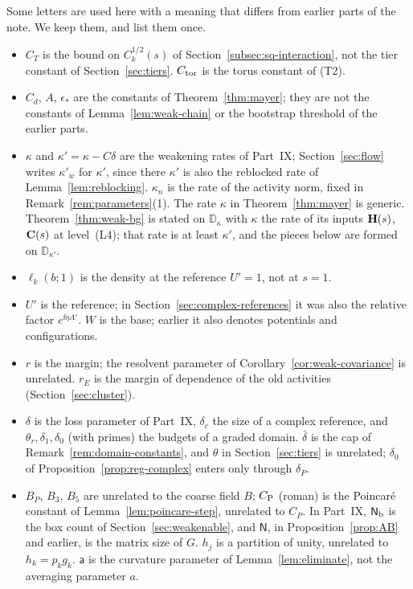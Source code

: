 \begin{remark}\label{rem:notation-flow}
Some letters are used here with a meaning that differs from earlier parts of the note. We keep them, and list them once.
\begin{itemize}
\item $C_T$ is the bound on $C_k^{1/2}(s)$ of Section~\ref{subsec:sq-interaction}, not the tier constant of Section~\ref{sec:tiers}. $C_{\rm tor}$ is the torus constant of (T2).
\item $C_d$, $A$, $\epsilon_*$ are the constants of Theorem~\ref{thm:mayer}; they are not the constants of Lemma~\ref{lem:weak-chain} or the bootstrap threshold of the earlier parts.
\item $\kappa$ and $\kappa'=\kappa-C\delta$ are the weakening rates of Part~IX; Section~\ref{sec:flow} writes $\kappa'_w$ for $\kappa'$, since there $\kappa'$ is also the reblocked rate of Lemma~\ref{lem:reblocking}. $\kappa_n$ is the rate of the activity norm, fixed in Remark~\ref{rem:parameters}(1). The rate $\kappa$ in Theorem~\ref{thm:mayer} is generic. Theorem~\ref{thm:weak-bg} is stated on $\mathbb D_\kappa$ with $\kappa$ the rate of its inputs $\mathbf H(s)$, $\mathbf C(s)$ at level~(L4); that rate is at least $\kappa'$, and the pieces below are formed on $\mathbb D_{\kappa'}$.
\item $\ell_k(b;1)$ is the density at the reference $U'=1$, not at $s=1$.
\item $U'$ is the reference; in Section~\ref{sec:complex-references} it was also the relative factor $e^{\ii\eta A'}$. $W$ is the base; earlier it also denotes potentials and configurations.
\item $r$ is the margin; the resolvent parameter of Corollary~\ref{cor:weak-covariance} is unrelated. $r_E$ is the margin of dependence of the old activities (Section~\ref{sec:cluster}).
\item $\delta$ is the loss parameter of Part~IX, $\delta_c$ the size of a complex reference, and $\theta_r,\delta_1,\delta_0$ (with primes) the budgets of a graded domain. $\bar\delta$ is the cap of Remark~\ref{rem:domain-constants}, and $\theta$ in Section~\ref{sec:tiers} is unrelated; $\delta_0$ of Proposition~\ref{prop:reg-complex} enters only through $\delta_P$.
\item $B_P$, $B_3$, $B_5$ are unrelated to the coarse field $B$; $C_{\rm P}$ (roman) is the Poincar\'e constant of Lemma~\ref{lem:poincare-step}, unrelated to $C_P$. In Part~IX, $\mathsf N_{\rm b}$ is the box count of Section~\ref{sec:weakenable}, and $\mathsf N$, in Proposition~\ref{prop:AB} and earlier, is the matrix size of $G$. $h_j$ is a partition of unity, unrelated to $h_k=p_kg_k$. $\mathsf a$ is the curvature parameter of Lemma~\ref{lem:eliminate}, not the averaging parameter $a$.

\end{itemize}
\end{remark}
